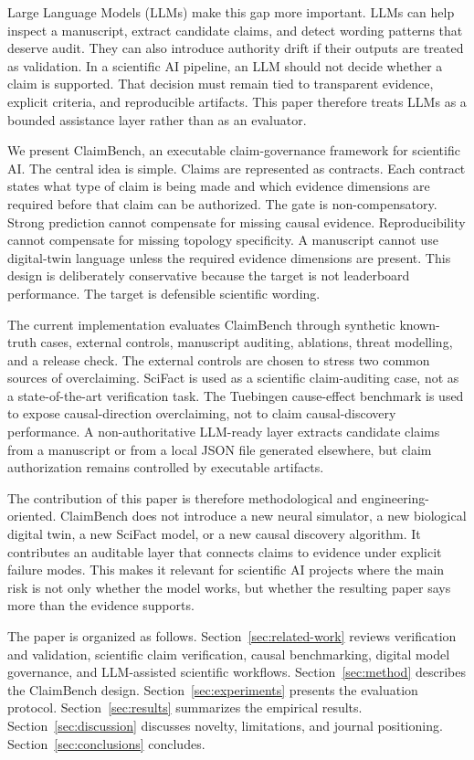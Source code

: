 Large Language Models (LLMs) make this gap more important. LLMs can help inspect a manuscript, extract candidate claims, and detect wording patterns that deserve audit. They can also introduce authority drift if their outputs are treated as validation. In a scientific AI pipeline, an LLM should not decide whether a claim is supported. That decision must remain tied to transparent evidence, explicit criteria, and reproducible artifacts. This paper therefore treats LLMs as a bounded assistance layer rather than as an evaluator.

We present ClaimBench, an executable claim-governance framework for scientific AI. The central idea is simple. Claims are represented as contracts. Each contract states what type of claim is being made and which evidence dimensions are required before that claim can be authorized. The gate is non-compensatory. Strong prediction cannot compensate for missing causal evidence. Reproducibility cannot compensate for missing topology specificity. A manuscript cannot use digital-twin language unless the required evidence dimensions are present. This design is deliberately conservative because the target is not leaderboard performance. The target is defensible scientific wording.

The current implementation evaluates ClaimBench through synthetic known-truth cases, external controls, manuscript auditing, ablations, threat modelling, and a release check. The external controls are chosen to stress two common sources of overclaiming. SciFact is used as a scientific claim-auditing case, not as a state-of-the-art verification task. The Tuebingen cause-effect benchmark is used to expose causal-direction overclaiming, not to claim causal-discovery performance. A non-authoritative LLM-ready layer extracts candidate claims from a manuscript or from a local JSON file generated elsewhere, but claim authorization remains controlled by executable artifacts.

The contribution of this paper is therefore methodological and engineering-oriented. ClaimBench does not introduce a new neural simulator, a new biological digital twin, a new SciFact model, or a new causal discovery algorithm. It contributes an auditable layer that connects claims to evidence under explicit failure modes. This makes it relevant for scientific AI projects where the main risk is not only whether the model works, but whether the resulting paper says more than the evidence supports.

The paper is organized as follows. Section~\ref{sec:related-work} reviews verification and validation, scientific claim verification, causal benchmarking, digital model governance, and LLM-assisted scientific workflows. Section~\ref{sec:method} describes the ClaimBench design. Section~\ref{sec:experiments} presents the evaluation protocol. Section~\ref{sec:results} summarizes the empirical results. Section~\ref{sec:discussion} discusses novelty, limitations, and journal positioning. Section~\ref{sec:conclusions} concludes.
